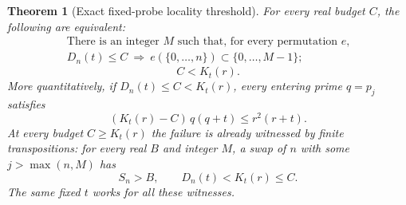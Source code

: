 \documentclass[11pt]{article}
\newtheorem{theorem}{Theorem}[section]
\theoremstyle{definition}
\begin{document}
\begin{theorem}[Exact fixed-probe locality threshold]
For every real budget $C$, the following are equivalent:
\[
 \begin{gathered}
 \text{There is an integer $M$ such that, for every permutation $e$,}\\
 D_n(t)\le C\ \Longrightarrow\
 e(\{0,\ldots,n\})\subset\{0,\ldots,M-1\};
 \end{gathered}
\]
\[
 C<K_t(r).
\]
More quantitatively, if $D_n(t)\le C<K_t(r)$, every entering prime
$q=p_j$ satisfies
\[
 (K_t(r)-C)\,q(q+t)\le r^2(r+t).
\]
At every budget $C\ge K_t(r)$ the failure is already witnessed by
finite transpositions: for every real $B$ and integer $M$, a swap
of $n$ with some $j>\max(n,M)$ has
\[
 S_n>B,\qquad D_n(t)<K_t(r)\le C.
\]
The same fixed $t$ works for all these witnesses.
\end{theorem}
\end{document}
